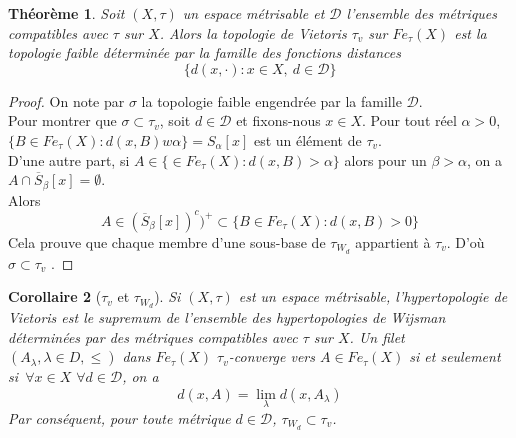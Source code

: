 \documentclass[11pt]{report}
\newenvironment{boxtheorem}
{\begin{tcolorbox}
		[enhanced jigsaw,breakable,pad at break*=2mm,
		colback=black!5,colframe=bleueLeger]}
	{\end{tcolorbox}}
\newenvironment{boxcorollaire}
{\begin{tcolorbox}
		[enhanced jigsaw,breakable,pad at break*=1mm,
		colback=black!5!white,boxrule=0pt,frame hidden,
		borderline east={1.5mm}{-2mm}{blue}]}
	{\end{tcolorbox}}
\theoremstyle{styletheorem}
\newtheorem{theoreme}{Théorème}[section]
\newtheorem{corollary}[theoreme]{Corollaire}
\newenvironment{theorem}
{\vspace*{0.3cm}\begin{boxtheorem}\begin{theoreme}}{\end{theoreme}\end{boxtheorem}\vspace*{0.3cm}}
\theoremstyle{styledef}
\theoremstyle{remark}
\newenvironment{corollaire}{\begin{boxcorollaire}\begin{corollary}}{\end{corollary}\end{boxcorollaire}}
\newcommand{\ssi}{si et seulement si\  }
\newcommand{\Fe}{\ensuremath{Fe_{\tau}(X)}}
\begin{document}
	\begin{theorem}\label{th125}
		Soit $(X,\tau)$ un espace métrisable et $\mathcal{D}$ l'ensemble  des métriques compatibles avec $\tau$ sur $X$. Alors la topologie de Vietoris $\tau_v$ sur $\Fe$ est la topologie faible déterminée par la famille des fonctions distances \cite{b8} $$\lbrace d(x,\cdot) \colon x \in X,\ d \in \mathcal{D} \rbrace$$ 
	\end{theorem}
	
	\begin{proof}
		On note par $\sigma$ la topologie faible engendrée par la famille $\mathcal{D}$.\\
		Pour montrer que $\sigma \subset \tau_v$, soit $d \in \mathcal{D}$ et fixons-nous $x \in X$. Pour tout réel $\alpha >0$, $\lbrace B \in \Fe \colon d(x,B) w \alpha \rbrace = S_\alpha [x]$ est un élément de $\tau_v$. \\
		D'une autre part, si $A \in \lbrace \in \Fe \colon d(x,B)> \alpha\rbrace$ alors pour un $\beta > \alpha$, on a $A \cap \overline{S}_\beta [x] = \emptyset$.\\
		Alors $$A \in (\overline{S}_\beta [x])^c)^+ \subset \lbrace B \in \Fe \colon d(x,B) >0 \rbrace$$
		Cela prouve que  chaque membre d'une sous-base de $\tau_{W_d}$ appartient à $\tau_v$. D'où $\sigma \subset \tau_v$ .
	\end{proof}
	
	
	\begin{corollaire}[$\tau_v$ et  $\tau_{W_d}$]\label{co134}
		Si $(X,\tau)$ est un espace métrisable, l'hypertopologie de Vietoris est le supremum de l'ensemble des hypertopologies de Wijsman déterminées par des métriques compatibles avec $\tau$ sur $X$. Un filet $(A_\lambda, \lambda \in D, \leq)$ dans $\Fe$ $\tau_v$-converge vers $A \in \Fe$ \ssi $\forall x \in X$ $\forall d \in \mathcal{D}$, on a $$d(x,A) = \lim_\lambda d(x,A_\lambda)$$
		Par conséquent, pour toute métrique $d \in \mathcal{D}$, $\tau_{W_d} \subset \tau_v$.
	\end{corollaire}\ 
	
\end{document}

